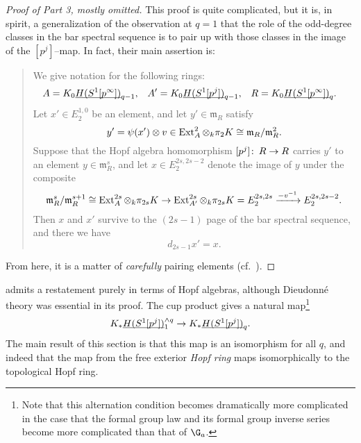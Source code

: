 \begin{proof}[Proof of Part 3, mostly omitted]
This proof is quite complicated, but it is, in spirit, a generalization of the observation at \(q = 1\) that the role of the odd-degree classes in the bar spectral sequence is to pair up with those classes in the image of the \([p^j]\)--map.  In fact, their main assertion is:
\begin{siderules}
\begin{quote}
We give notation for the following rings:
\begin{align*}
A & = K_0 \OS{H(S^1[p^\infty])}{q-1}, &
A' & = K_0 \OS{H(S^1[p^j])}{q-1}, &
R & = K_0 \OS{H(S^1[p^\infty])}{q}.
\end{align*}
Let \(x' \in E_2^{1, 0}\) be an element, and let \(y' \in \mathfrak m_R\) satisfy \[y' = \psi(x') \otimes v \in \operatorname{Ext}^2_A \otimes_k \pi_2 K \cong \mathfrak m_R / \mathfrak m_R^2.\]  Suppose that the Hopf algebra homomorphism \([p^j]\colon\thinspace R \to R\) carries \(y'\) to an element \(y \in \mathfrak m_R^s\), and let \(x \in E_2^{2s, 2s-2}\) denote the image of \(y\) under the composite \[\mathfrak m_R^s / \mathfrak m_R^{s+1} \cong \operatorname{Ext}_A^{2s} \otimes_k \pi_{2s} K \to \operatorname{Ext}_{A'}^{2s} \otimes_k \pi_{2s} K = E_2^{2s, 2s} \xrightarrow{-v^{-1}} E_2^{2s, 2s-2}.\]  Then \(x\) and \(x'\) survive to the \((2s - 1)\){\th} page of the bar spectral sequence, and there we have \[d_{2s-1} x' = x.\]
\end{quote}
\end{siderules}
From here, it is a matter of \emph{carefully} pairing elements (cf.\ \cite[pg.\ 60]{HopkinsLurie}).
\end{proof}

\begin{remark}
 admits a restatement purely in terms of Hopf algebras, although Dieudonn\'e theory was essential in its proof.  The cup product gives a natural map\footnote{Note that this alternation condition becomes dramatically more complicated in the case that the formal group law and its formal group inverse series become more complicated than that of \(\G_a\).} \[K_* \OS{H(S^1[p^j])}{1}^{\wedge q} \to K_* \OS{H(S^1[p^j])}{q}.\]  The main result of this section is that this map is an isomorphism for all \(q\), and indeed that the map from the free exterior \emph{Hopf ring} maps isomorphically to the topological Hopf ring.
\end{remark}

